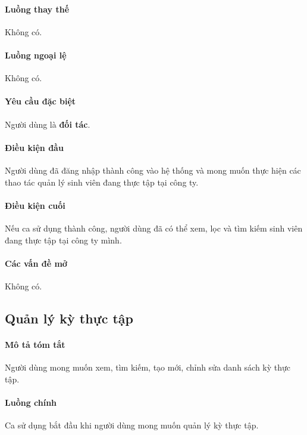 \documentclass[./../main.tex]{subfiles}
\begin{document}
\paragraph*{Luồng thay thế} Không có.

\paragraph*{Luồng ngoại lệ} Không có.

\paragraph*{Yêu cầu đặc biệt}

Người dùng là \textbf{đối tác}.

\paragraph*{Điều kiện đầu}

Người dùng đã đăng nhập thành công vào hệ thống và mong muốn thực hiện các thao tác quản lý sinh viên đang thực tập tại công ty.

\paragraph*{Điều kiện cuối}

Nếu ca sử dụng thành công, người dùng đã có thể xem, lọc và tìm kiếm sinh viên đang thực tập tại công ty mình.

\paragraph*{Các vấn đề mở}

Không có.

\subsection{Quản lý kỳ thực tập}

\paragraph*{Mô tả tóm tắt}

Người dùng mong muốn xem, tìm kiếm, tạo mới, chỉnh sửa danh sách kỳ thực tập.

\paragraph*{Luồng chính} Ca sử dụng bắt đầu khi người dùng mong muốn quản lý kỳ thực tập.
\end{document}
